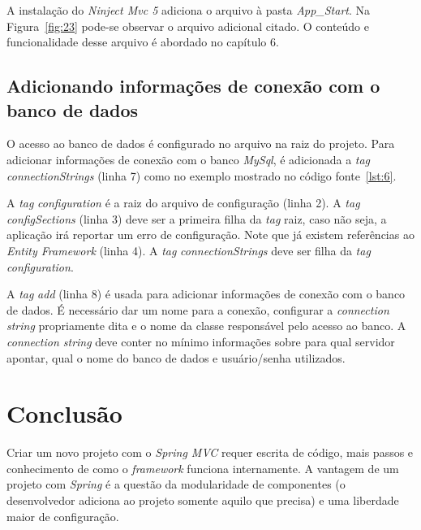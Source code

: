 A instalação do \textit{Ninject Mvc 5} adiciona o arquivo  à pasta \textit{App\_Start}. Na Figura~\ref{fig:23} pode-se observar o arquivo adicional citado. O conteúdo e funcionalidade desse arquivo é abordado no capítulo 6.


\subsection{Adicionando informações de conexão com o banco de dados}

O acesso ao banco de dados é configurado no arquivo  na raiz do projeto. Para adicionar informações de conexão com o banco \textit{MySql}, é adicionada a \textit{tag} \textit{connectionStrings} (linha 7) como no exemplo mostrado no código fonte~\ref{lst:6}.


A \textit{tag} \textit{configuration} é a raiz do arquivo de configuração (linha 2). A \textit{tag} \textit{configSections} (linha 3) deve ser a primeira filha da \textit{tag} raiz, caso não seja, a aplicação irá reportar um erro de configuração. Note que já existem referências ao \textit{Entity Framework} (linha 4). A \textit{tag} \textit{connectionStrings} deve ser filha da \textit{tag} \textit{configuration}.

A \textit{tag} \textit{add} (linha 8) é usada para adicionar informações de conexão com o banco de dados. É necessário dar um nome para a conexão, configurar a \textit{connection string} propriamente dita e o nome da classe responsável pelo acesso ao banco. A \textit{connection string} deve conter no mínimo informações sobre para qual servidor apontar, qual o nome do banco de dados e usuário/senha utilizados. 

\section{Conclusão}

Criar um novo projeto com o \textit{Spring MVC} requer escrita de código, mais passos e conhecimento de como o \textit{framework} funciona internamente. A vantagem de um projeto com \textit{Spring} é a questão da modularidade de componentes (o desenvolvedor adiciona ao projeto somente aquilo que precisa) e uma liberdade maior de configuração.

